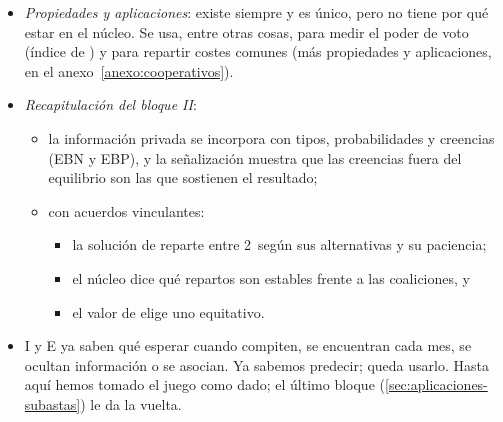\documentclass[11pt]{article}
\begin{document}
\begin{itemize}
\begin{itemize}
\begin{itemize}
    \item promediando los 6~órdenes posibles, $\phi=\big(66\tfrac23,\ 6\tfrac23,\ 26\tfrac23\big)$ para \textup{I}, E y O.
    \end{itemize}
  \item Se reparte todo (eficiencia), y E recibe algo porque su presencia sube lo que \textup{I} puede pedir. Por eso no está en el núcleo: da algo a E, que no se queda con la red.
  \item Núcleo y valor de  responden a preguntas distintas: el primero, a qué repartos resisten la competencia; el segundo, a cuál es equitativo según la aportación de cada uno.
  \end{itemize}
\item \emph{Propiedades y aplicaciones}: existe siempre y es único, pero no tiene por qué estar en el núcleo. Se usa, entre otras cosas, para medir el poder de voto (índice de \textcite{ShapleyShubik1954Method})  y para repartir costes comunes (más propiedades y aplicaciones, en el anexo~\ref{anexo:cooperativos}).
\end{itemize}

\begin{itemize}
\item \emph{Recapitulación del bloque II}:
  \begin{itemize}
  \item la información privada se incorpora con tipos, probabilidades y creencias (EBN y EBP), y la señalización muestra que las creencias fuera del equilibrio son las que sostienen el resultado;
  \item con acuerdos vinculantes:
    \begin{itemize}
    \item la solución de  reparte entre 2~según sus alternativas y su paciencia;
    \item el núcleo dice qué repartos son estables frente a las coaliciones, y
    \item el valor de  elige uno equitativo.
    \end{itemize}
  \end{itemize}
\item I y E ya saben qué esperar cuando compiten, se encuentran cada mes, se ocultan información o se asocian. Ya sabemos predecir; queda usarlo. Hasta aquí hemos tomado el juego como dado; el último bloque (\ref{sec:aplicaciones-subastas}) le da la vuelta.
\end{itemize}
\end{document}

